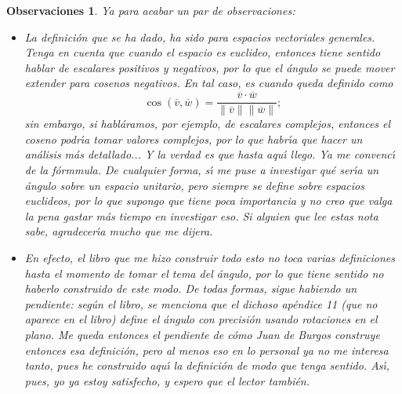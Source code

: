 \documentclass[a4paper,11pt]{article}
\theoremstyle{teoremas}
\theoremstyle{ejemplos}
\theoremstyle{definiciones}
\theoremstyle{lemas}
\newtheorem*{observaciones}{Observaciones}
\begin{document}
\begin{observaciones}
 Ya para acabar un par de observaciones:
 \begin{itemize}
  \item La definici\'on que se ha dado, ha sido para espacios vectoriales generales. Tenga en cuenta que cuando el espacio es euclideo, entonces tiene sentido hablar de escalares positivos y negativos, por lo que el \'angulo se puede mover extender para cosenos negativos. En tal caso, es cuando queda definido como
  \begin{equation}
   \cos\left( \overline{v}, \overline{w} \right) = \frac{\overline{v} \cdot \overline{w}}{\lVert \overline{v} \rVert \lVert \overline{w} \rVert};
  \end{equation}
  sin embargo, si habl\'aramos, por ejemplo, de escalares complejos, entonces el coseno podr\'{\i}a tomar valores complejos, por lo que habr\'{\i}a que hacer un an\'alisis m\'as detallado... Y la verdad es que hasta aqu\'{\i} llego. Ya me convenc\'{\i} de la f\'ormmula. De cualquier forma, s\'{\i} me puse a investigar qu\'e ser\'{\i}a un \'angulo sobre un espacio unitario, pero siempre se define sobre espacios euclideos, por lo que supongo que tiene poca importancia y no creo que valga la pena gastar m\'as tiempo en investigar eso. Si alguien que lee estas nota sabe, agradecer\'{\i}a mucho que me dijera.
  \item En efecto, el libro que me hizo construir todo esto no toca varias definiciones hasta el momento de tomar el tema del \'angulo, por lo que tiene sentido no haberlo construido de este modo. De todas formas, sigue habiendo un pendiente: seg\'un el libro, se menciona que el dichoso ap\'endice 11 (que no aparece en el libro) define el \'angulo con precisi\'on usando rotaciones en el plano. Me queda entonces el pendiente de c\'omo Juan de Burgos construye entonces esa definici\'on, pero al menos eso en lo personal ya no me interesa tanto, pues he construido aqu\'{\i} la definici\'on de modo que tenga sentido. As\'{\i}, pues, yo ya estoy satisfecho, y espero que el lector tambi\'en.
 \end{itemize}

\end{observaciones}
\end{document}
